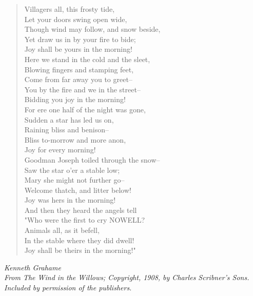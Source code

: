 
\begin{verse}
Villagers all, this frosty tide,\\
Let your doors swing open wide,\\
Though wind may follow, and snow beside,\\
Yet draw us in by your fire to bide;\\
\hspace*{2em}Joy shall be yours in the morning!\\[0.7em]

Here we stand in the cold and the sleet,\\
Blowing fingers and stamping feet,\\
Come from far away you to greet--\\
You by the fire and we in the street--\\
\hspace*{2em}Bidding you joy in the morning!\\[0.7em]

For ere one half of the night was gone,\\
Sudden a star has led us on,\\
Raining bliss and benison--\\
Bliss to-morrow and more anon,\\
\hspace*{2em}Joy for every morning!\\[0.7em]

Goodman Joseph toiled through the snow--\\
Saw the star o'er a stable low;\\
Mary she might not further go--\\
Welcome thatch, and litter below!\\
\hspace*{2em}Joy was hers in the morning!\\[0.7em]

And then they heard the angels tell\\
"Who were the first to cry NOWELL?\\
Animals all, as it befell,\\
In the stable where they did dwell!\\
\hspace*{2em}Joy shall be theirs in the morning!"%
\end{verse}

\vspace{0.5\baselineskip}
\noindent\textit{Kenneth Grahame}\\
\noindent\textit{From \emph{The Wind in the Willows}; Copyright, 1908, by Charles Scribner's Sons.}\\
\noindent\textit{Included by permission of the publishers.}

\newpage
